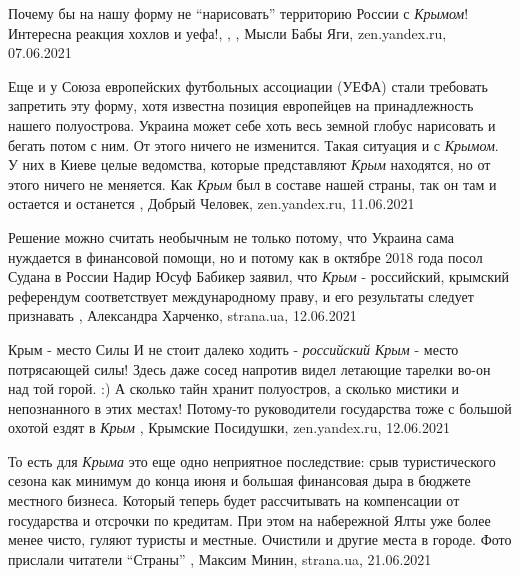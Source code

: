 Почему бы на нашу форму не \enquote{нарисовать} территорию России с \emph{Крымом}! Интересна реакция хохлов и уефа!,
,
, Мысли Бабы Яги, zen.yandex.ru, 07.06.2021

Еще и у Союза европейских футбольных ассоциации (УЕФА) стали требовать
запретить эту форму, хотя известна позиция европейцев на принадлежность нашего
полуострова. Украина может себе хоть весь земной глобус нарисовать и бегать
потом с ним. От этого ничего не изменится. Такая ситуация и с \emph{Крымом}. У них в
Киеве целые ведомства, которые представляют \emph{Крым} находятся, но от этого ничего
не меняется. Как \emph{Крым} был в составе нашей страны, так он там и остается и
останется
, 
Добрый Человек, zen.yandex.ru, 11.06.2021

Решение можно считать необычным не только потому, что Украина сама нуждается в
финансовой помощи, но и потому как в октябре 2018 года посол Судана в России
Надир Юсуф Бабикер заявил, что \emph{Крым} - российский, крымский референдум
соответствует международному праву, и его результаты следует признавать
, 
Александра Харченко, strana.ua, 12.06.2021

Крым - место Силы
И не стоит далеко ходить - \emph{российский Крым} - место потрясающей силы! Здесь даже
сосед напротив видел летающие тарелки во-он над той горой. :) А сколько тайн
хранит полуостров, а сколько мистики и непознанного в этих местах! Потому-то
руководители государства тоже с большой охотой ездят в \emph{Крым}
, 
Крымские Посидушки, zen.yandex.ru, 12.06.2021

То есть для \emph{Крыма} это еще одно неприятное последствие: срыв
туристического сезона как минимум до конца июня и большая финансовая дыра в
бюджете местного бизнеса. Который теперь будет рассчитывать на компенсации от
государства и отсрочки по кредитам. При этом на набережной Ялты уже более менее
чисто, гуляют туристы и местные. Очистили и другие места в городе. Фото
прислали читатели \enquote{Страны}
, 
Максим Минин, strana.ua, 21.06.2021


